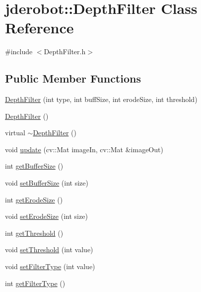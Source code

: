 \hypertarget{classjderobot_1_1_depth_filter}{}\section{jderobot\+:\+:Depth\+Filter Class Reference}
\label{classjderobot_1_1_depth_filter}


{\ttfamily \#include $<$Depth\+Filter.\+h$>$}

\subsection*{Public Member Functions}
\begin{DoxyCompactItemize}
\item 
\hyperlink{classjderobot_1_1_depth_filter_a5f1717aa509c378e2124f9ab86dfe584}{Depth\+Filter} (int type, int buff\+Size, int erode\+Size, int threshold)
\item 
\hyperlink{classjderobot_1_1_depth_filter_afd0b86c3f0bf4328025ee4f92934f564}{Depth\+Filter} ()
\item 
virtual \hyperlink{classjderobot_1_1_depth_filter_a6bc39bb21bc8a8685e910ddbc70bef20}{$\sim$\+Depth\+Filter} ()
\item 
void \hyperlink{classjderobot_1_1_depth_filter_adc334eab73132c4ae1f44da6db02ae70}{update} (cv\+::\+Mat image\+In, cv\+::\+Mat \&image\+Out)
\item 
int \hyperlink{classjderobot_1_1_depth_filter_a0906e79126a1447526a40fe2345d7653}{get\+Buffer\+Size} ()
\item 
void \hyperlink{classjderobot_1_1_depth_filter_a619b72f8bded1c3ea8e3a02f2bcb21ec}{set\+Buffer\+Size} (int size)
\item 
int \hyperlink{classjderobot_1_1_depth_filter_a6ce70c6b569e38f4bf95037fc32e9474}{get\+Erode\+Size} ()
\item 
void \hyperlink{classjderobot_1_1_depth_filter_a9e8d63b72611be1fca6913241c162889}{set\+Erode\+Size} (int size)
\item 
int \hyperlink{classjderobot_1_1_depth_filter_a47fc6768210b2b11df536729c04a23cb}{get\+Threshold} ()
\item 
void \hyperlink{classjderobot_1_1_depth_filter_af7ddc46805bded3d3f8ad24bc866268c}{set\+Threshold} (int value)
\item 
void \hyperlink{classjderobot_1_1_depth_filter_abb7692e32727b32edebb1f01601dfbe7}{set\+Filter\+Type} (int value)
\item 
int \hyperlink{classjderobot_1_1_depth_filter_a5d0a063ea9641f5bcf3dd71c3d45609f}{get\+Filter\+Type} ()

\end{DoxyCompactItemize}

